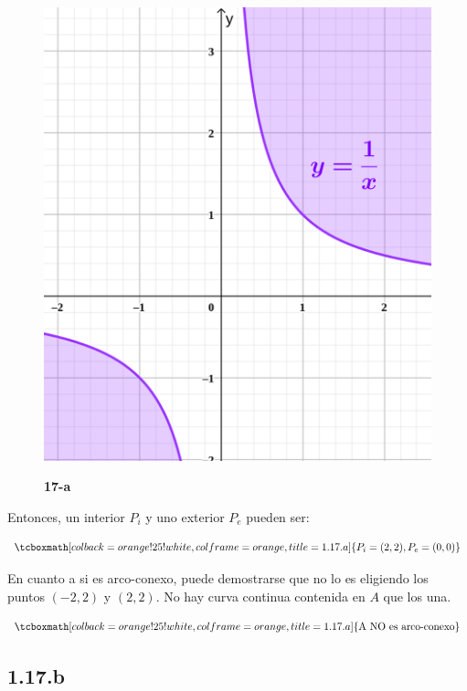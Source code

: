 \documentclass{article}
\begin{document}
\begin{figure}[ht]
\caption{\textbf{17-a}}
\includegraphics[scale=1]{../img/exercises/guide_01/11_g.png} 
\centering
\label{fig:1-17-a}
\end{figure}

Entonces, un interior $P_i$ y uno exterior $P_e$ pueden ser:

\begin{equation}
\tcboxmath[colback=orange!25!white,colframe=orange,title=1.17.a]
{
P_i = (2,2), P_e = (0, 0)
}
\end{equation}

En cuanto a si es arco-conexo, puede demostrarse que no lo es eligiendo los puntos $(-2,2)$ y $(2,2)$. No hay curva continua contenida en $A$ que los una.

\begin{equation}
\tcboxmath[colback=orange!25!white,colframe=orange,title=1.17.a]
{ \text{A NO es arco-conexo} }
\end{equation}

\subsection*{1.17.b}
\label{subsec:1.17.b}
\end{document}
